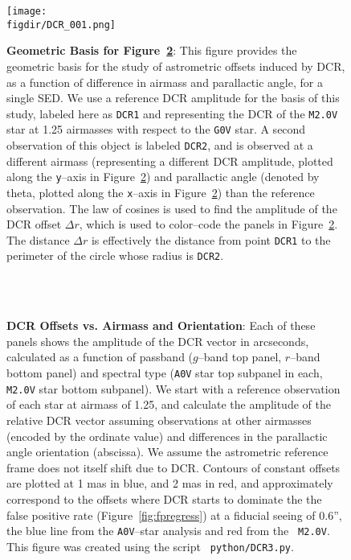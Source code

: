 \documentclass[prd, nofootinbib, floatfix, 11pt, tightenlines, times]{article}
\def\figdir{../figures}
\begin{document}
\begin{figure}[!ht]
  \centering
  \texttt{[image: \\figdir/DCR\_001.png]} 
  \caption{{\bf Geometric Basis for Figure~\ref{fig:fpsummary}}: This
    figure provides the geometric basis for the study of astrometric
    offsets induced by DCR, as a function of difference in airmass and
    parallactic angle, for a single SED.  We use a reference DCR
    amplitude for the basis of this study, labeled here as {\tt DCR1}
    and representing the DCR of the {\tt M2.0V} star at 1.25 airmasses
    with respect to the {\tt G0V} star.  A second observation of this
    object is labeled {\tt DCR2}, and is observed at a different
    airmass (representing a different DCR amplitude, plotted along the
    {\tt y}--axis in Figure~\ref{fig:fpsummary}) and parallactic angle
    (denoted by theta, plotted along the {\tt x}--axis in
    Figure~\ref{fig:fpsummary}) than the reference observation.  The
    law of cosines is used to find the amplitude of the DCR offset
    $\Delta r$, which is used to color--code the panels in
    Figure~\ref{fig:fpsummary}.  The distance $\Delta r$ is
    effectively the distance from point {\tt DCR1} to the perimeter of
    the circle whose radius is {\tt DCR2}.}
  \label{fig:fpgeom}
\end{figure}

\begin{figure}[!ht]
  \centering
   \\
   \\
  \caption{{\bf DCR Offsets vs. Airmass and Orientation}: Each of
    these panels shows the amplitude of the DCR vector in arcseconds,
    calculated as a function of passband ($g$--band top panel,
    $r$--band bottom panel) and spectral type ({\tt A0V} star top
    subpanel in each, {\tt M2.0V} star bottom subpanel).  We start
    with a reference observation of each star at airmass of 1.25, and
    calculate the amplitude of the relative DCR vector assuming
    observations at other airmasses (encoded by the ordinate value)
    and differences in the parallactic angle orientation (abscissa).
    We assume the astrometric reference frame does not itself shift
    due to DCR.  Contours of constant offsets are plotted at 1 mas in
    blue, and 2 mas in red, and approximately correspond to the
    offsets where DCR starts to dominate the the false positive rate
    (Figure~\ref{fig:fpregress}) at a fiducial seeing of 0.6'', the
    blue line from the {\tt A0V}--star analysis and red from the {\tt
      M2.0V}.  This figure was created using the script {\tt
      python/DCR3.py}.}
  \label{fig:fpsummary}
\end{figure}
\end{document}
